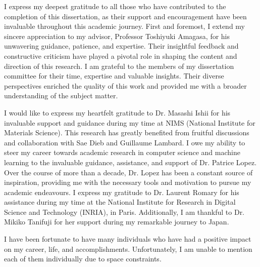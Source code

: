 I express my deepest gratitude to all those who have contributed to the completion of this dissertation, as their support and encouragement have been invaluable throughout this academic journey.
First and foremost, I extend my sincere appreciation to my advisor, Professor Toshiyuki Amagasa, for his unwavering guidance, patience, and expertise. Their insightful feedback and constructive criticism have played a pivotal role in shaping the content and direction of this research.
I am grateful to the members of my dissertation committee for their time, expertise and valuable insights. Their diverse perspectives enriched the quality of this work and provided me with a broader understanding of the subject matter.

I would like to express my heartfelt gratitude to Dr. Masashi Ishii for his invaluable support and guidance during my time at NIMS (National Institute for Materials Science).
This research has greatly benefited from fruitful discussions and collaboration with Sae Dieb and Guillaume Lambard. 
I owe my ability to steer my career towards academic research in computer science and machine learning to the invaluable guidance, assistance, and support of Dr. Patrice Lopez. Over the course of more than a decade, Dr. Lopez has been a constant source of inspiration, providing me with the necessary tools and motivation to pursue my academic endeavours.
I express my gratitude to Dr. Laurent Romary for his assistance during my time at the National Institute for Research in Digital Science and Technology (INRIA), in Paris. Additionally, I am thankful to Dr. Mikiko Tanifuji for her support during my remarkable journey to Japan. 

I have been fortunate to have many individuals who have had a positive impact on my career, life, and accomplishments. Unfortunately, I am unable to mention each of them individually due to space constraints.